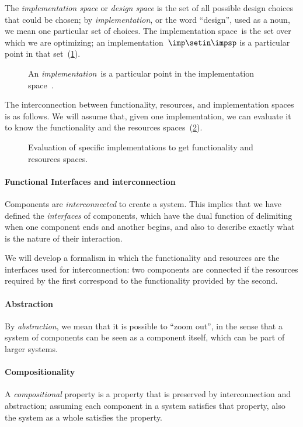 The \emph{implementation space} or \textit{design space} is the set of all possible design choices that could be chosen; by \textit{implementation}, or the word ``design'', used as a noun, we mean one particular set of choices.
The implementation space~\impsp is the set over which we are optimizing; an implementation~$\imp\setin\impsp$ is a particular point in that set~(\cref{fig:impspace}).

\begin{figure}[h!]
    \centering
    \caption{An \emph{implementation}~\imp is a particular point in the implementation space~\impsp.}
    \label{fig:impspace}
\end{figure}

The interconnection between functionality, resources, and implementation spaces is as follows.
We will assume that, given one implementation, we can evaluate it to know the functionality and the resources spaces~(\cref{fig:FIR}).

\begin{figure}[h!]
    \centering
    \caption{Evaluation of specific implementations to get functionality and resources spaces.\label{fig:FIR}}
\end{figure}

\paragraph{Functional Interfaces and interconnection}
Components are \emph{interconnected} to create a system.
This implies that we have defined the \emph{interfaces} of components, which have the dual function of delimiting when one component ends and another begins, and also to describe exactly what is the nature of their interaction.

We will develop a formalism in which the functionality and resources are the interfaces used for interconnection: two components are connected if the resources required by the first correspond to the functionality provided by the second.

\paragraph{Abstraction}
By \emph{abstraction}, we mean that it is possible to ``zoom out'', in the sense that a system of components can be seen as a component itself, which can be part of larger systems.

\paragraph{Compositionality}
A \emph{compositional} property is a property that is preserved by interconnection and abstraction; assuming each component in a system satisfies that property, also the system as a whole satisfies the property.

